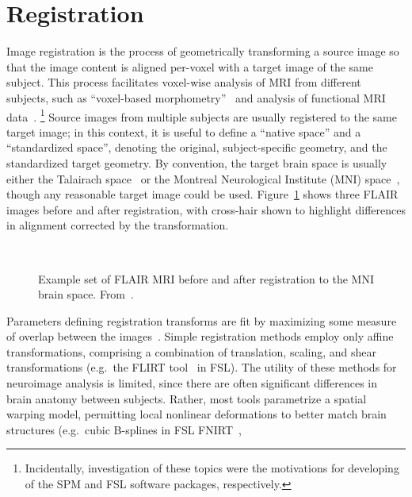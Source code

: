 \section{Registration}\label{s:pre-reg}
Image registration is the process of geometrically transforming a source image
so that the image content is aligned per-voxel with a target image of the same subject.
This process facilitates voxel-wise analysis of MRI from different subjects,
such as  ``voxel-based morphometry''~\cite{Ashburner2000a}
and analysis of functional MRI data~\cite{Smith2004}.%
\footnote{Incidentally, investigation of these topics were the motivations
  for developing of the SPM and FSL software packages, respectively.}
Source images from multiple subjects are usually registered to the same target image;
in this context, it is useful to define a ``native space'' and a ``standardized space'',
denoting the original, subject-specific geometry, and the standardized target geometry.
By convention, the target brain space is usually either
the Talairach space~\cite{Talairach1988} or
the Montreal Neurological Institute (MNI) space~\cite{Evans1993},
though any reasonable target image could be used.
Figure~\ref{fig:pre-registration} shows three FLAIR images before and after registration,
with cross-hair shown to highlight differences in alignment corrected by the transformation.
\par
\begin{figure}
  \centering
  \\[0.5em]
  \caption{Example set of FLAIR MRI before and after registration to the MNI brain space.
    From~\cite{WMHSEG2017}.}%
  \label{fig:pre-registration}
\end{figure}
Parameters defining registration transforms are fit by
maximizing some measure of overlap between the images~\cite{Sotiras2013}.
Simple registration methods employ only affine transformations,
comprising a combination of translation, scaling, and shear transformations
(e.g.\ the FLIRT tool~\cite{Jenkinson2002} in FSL).
The utility of these methods for neuroimage analysis is limited,
since there are often significant differences in brain anatomy between subjects.
Rather, most tools parametrize a spatial warping model,
permitting local nonlinear deformations to better match brain structures (e.g.\
cubic B-splines in FSL FNIRT~\cite{Andersson2007},
